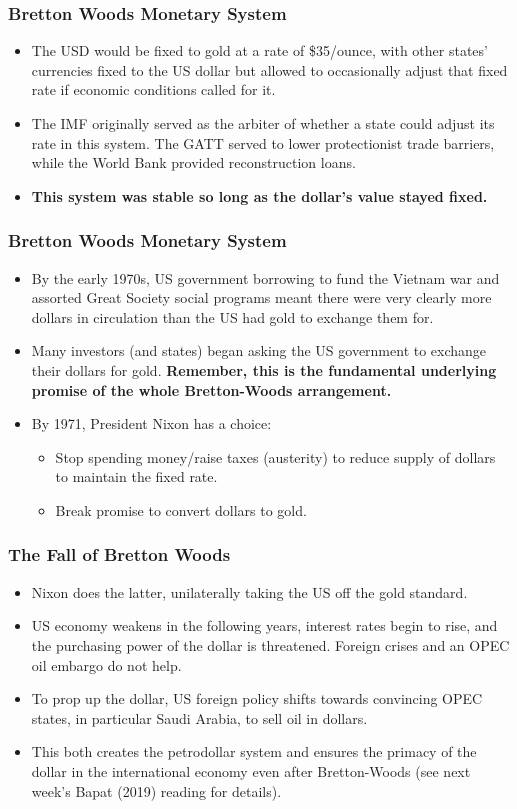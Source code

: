 \documentclass{beamer}
\begin{document}
\begin{frame} 
	\frametitle{\LARGE{Bretton Woods Monetary System}}
	\begin{itemize}
		\item The USD would be fixed to gold at a rate of \$35/ounce, with other states' currencies fixed to the US dollar but allowed to occasionally adjust that fixed rate if economic conditions called for it. \pause
		\item The IMF originally served as the arbiter of whether a state could adjust its rate in this system. The GATT served to lower protectionist trade barriers, while the World Bank provided reconstruction loans. \pause
		\item \textbf{This system was stable so long as the dollar's value stayed fixed.}
	\end{itemize}
\end{frame}

\begin{frame} 
	\frametitle{\LARGE{Bretton Woods Monetary System}}
	\begin{itemize}
		\item By the early 1970s, US government borrowing to fund the Vietnam war and assorted Great Society social programs meant there were very clearly more dollars in circulation than the US had gold to exchange them for. \pause
		\item Many investors (and states) began asking the US government to exchange their dollars for gold. \textbf{Remember, this is the fundamental underlying promise of the whole Bretton-Woods arrangement.} \pause
		\item By 1971, President Nixon has a choice:
		\begin{itemize}
			\item Stop spending money/raise taxes (austerity) to reduce supply of dollars to maintain the fixed rate.
			\item Break promise to convert dollars to gold.
		\end{itemize}		
	\end{itemize}
\end{frame}

\begin{frame} 
	\frametitle{\LARGE{The Fall of Bretton Woods}}
	\begin{itemize}
		\item Nixon does the latter, unilaterally taking the US off the gold standard. \pause
		\item US economy weakens in the following years, interest rates begin to rise, and the purchasing power of the dollar is threatened. Foreign crises and an OPEC oil embargo do not help. \pause
		\item To prop up the dollar, US foreign policy shifts towards convincing OPEC states, in particular Saudi Arabia, to sell oil in dollars.	\pause
		\item This both creates the petrodollar system and ensures the primacy of the dollar in the international economy even after Bretton-Woods (see next week's Bapat (2019) reading for details). 
	\end{itemize}
\end{frame}
\end{document}
